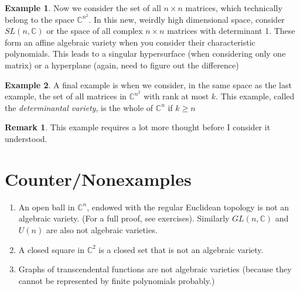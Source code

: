 \documentclass[12pt]{book}
\theoremstyle{definition}
\newtheorem{example}{Example}[chapter]
\newtheorem*{remark}{Remark}
\begin{document}
\begin{example}
Now we consider the set of all $n \times n$ matrices, which technically belong to the space $\mathbb{C}^{n^2}$. In this new, weirdly high dimensional space, consider $SL(n, \mathbb{C})$ or the space of all complex $n\times n$ matrices with determinant 1. These form an affine algebraic variety when you consider their characteristic polynomials. This leads to a singular hypersurface (when considering only one matrix) or a hyperplane (again, need to figure out the difference)
\end{example}
\begin{example}
    A final example is when we consider, in the same space as the last example, the set of all matrices in $\mathbb{C}^{n^2}$ with rank at most $k$. This example, called the \textit{determinantal variety}, is the whole of $\mathbb{C}^n$ if $k \geq n$ 
    \begin{remark}
        This example requires a lot more thought before I consider it understood.
    \end{remark}
\end{example}
\section*{Counter/Nonexamples}
\begin{enumerate}
    \item An open ball in $\mathbb{C}^n$, endowed with the regular Euclidean topology is not an algebraic variety. (For a full proof, see exercises). Similarly $GL(n, \mathbb{C})$ and $U(n)$ are also not algebraic varieties.
    \item A closed square in $\mathbb{C}^2$ is a closed set that is not an algebraic variety.
    \item Graphs of transcendental functions are not algebraic varieties (because they cannot be represented by finite polynomials probably.)
\end{enumerate}
\end{document}
